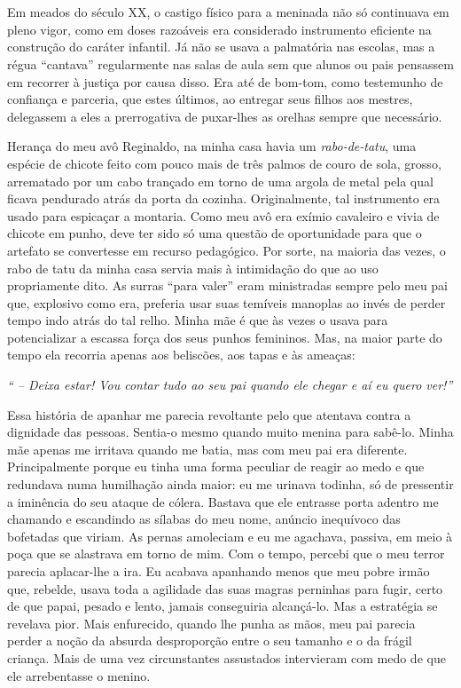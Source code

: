 \chapter{}
Em meados do século XX, o castigo físico para a meninada não só continuava em pleno vigor, como em doses razoáveis era considerado instrumento eficiente na construção do caráter infantil. 
Já não se usava a palmatória nas escolas, mas a régua ``cantava'' regularmente nas salas de aula sem que alunos ou pais pensassem em recorrer à justiça por causa disso. 
Era até de bom-tom, como testemunho de confiança e parceria, que estes últimos, ao entregar seus filhos aos mestres, delegassem a eles a prerrogativa de puxar-lhes as orelhas sempre que necessário.

Herança do meu avô Reginaldo, na minha casa havia um \textit{rabo-de-tatu}, uma espécie de chicote feito com pouco mais de três palmos de couro de sola, grosso, arrematado por um cabo trançado em torno de uma argola de metal pela qual ficava pendurado atrás da porta da cozinha. 
Originalmente, tal instrumento era usado para espicaçar a montaria. Como meu avô era exímio cavaleiro e vivia de chicote em punho, deve ter sido só uma questão de oportunidade para que o artefato se convertesse em recurso pedagógico. 
Por sorte, na maioria das vezes, o rabo de tatu da minha casa servia mais à intimidação do que ao uso propriamente dito. 
As surras ``para valer'' eram ministradas sempre pelo meu pai que, explosivo como era, preferia usar suas temíveis manoplas ao invés de perder tempo indo atrás do tal relho. 
Minha mãe é que às vezes o usava para potencializar a escassa força dos seus punhos femininos. Mas, na maior parte do tempo ela recorria apenas aos beliscões, aos tapas e às ameaças:

{\itshape `` -- Deixa estar! Vou contar tudo ao seu pai quando ele chegar e aí eu quero ver!''}

Essa história de apanhar me parecia revoltante pelo que atentava contra a dignidade das pessoas. 
Sentia-o mesmo quando muito menina para sabê-lo. 
Minha mãe apenas me irritava quando me batia, mas com meu pai era diferente.  
Principalmente porque eu tinha uma forma peculiar de reagir ao medo e que redundava numa humilhação ainda maior: eu me urinava todinha, só de pressentir a iminência do seu ataque de cólera. 
Bastava que ele entrasse porta adentro me chamando e escandindo as sílabas do meu nome, anúncio inequívoco das bofetadas que viriam. 
As pernas amoleciam e eu me agachava, passiva, em meio à poça que se alastrava em torno de mim. Com o tempo, percebi que o meu terror parecia aplacar-lhe a ira. 
Eu acabava apanhando menos que meu pobre irmão que, rebelde, usava toda a agilidade das suas magras perninhas para fugir, certo de que papai, pesado e lento, jamais conseguiria alcançá-lo. 
Mas a estratégia se revelava pior. Mais enfurecido, quando lhe punha as mãos, meu pai parecia perder a noção da absurda desproporção entre o seu tamanho e o da frágil criança. 
Mais de uma vez circunstantes assustados intervieram com medo de que ele arrebentasse o menino. 

